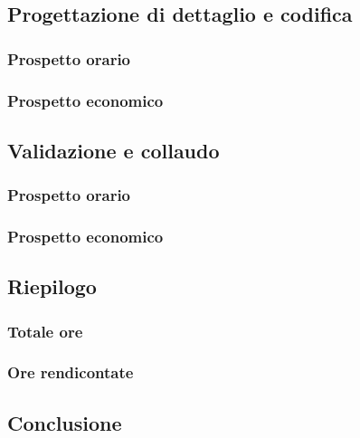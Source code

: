 \subsection{Progettazione di dettaglio e codifica}

\subsubsection{Prospetto orario}



\subsubsection{Prospetto economico}





\subsection{Validazione e collaudo}

\subsubsection{Prospetto orario}



\subsubsection{Prospetto economico}


\subsection{Riepilogo}

\subsubsection{Totale ore}




\subsubsection{Ore rendicontate}



\subsection{Conclusione}
